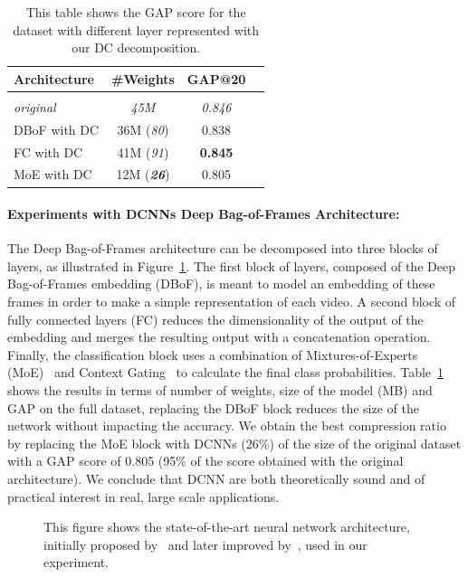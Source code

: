 \begin{table}
  \centering
  \caption{This table shows the GAP score for the \yt dataset with different layer represented with our DC decomposition.}
  \begin{tabular}{lccc}
  \toprule
  \textbf{Architecture} & \textbf{\#Weights} & \textbf{GAP@20} \\
  \hline \\
  \textit{original} & \textit{45M} & \textit{0.846} \\
  DBoF with DC   & 36M (\textit{80}) & 0.838 \\
  FC with DC    & 41M (\textit{91}) & \textbf{0.845} \\
  MoE with DC   & 12M (\textit{\textbf{26}}) & 0.805 \\
  \hline
  \end{tabular}
  \label{table:youtube_full_xp}
\end{table}

\paragraph{Experiments with DCNNs Deep Bag-of-Frames Architecture:}
The Deep Bag-of-Frames architecture can be decomposed into three blocks of layers, as illustrated in Figure~\ref{figure:archi_youtube}.
The first block of layers, composed of the Deep Bag-of-Frames embedding (DBoF), is meant to model an embedding of these frames in order to make a simple representation of each video.
A second block of fully connected layers (FC) reduces the dimensionality of the output of the embedding and merges the resulting output with a concatenation operation.
Finally, the classification block uses a combination of Mixtures-of-Experts (MoE)~\cite{716791,45619} and Context Gating~\cite{miech2017learnable} to calculate the final class probabilities.
Table~\ref{table:youtube_full_xp} shows the results in terms of number of weights, size of the model (MB) and GAP on the full dataset, replacing the DBoF block reduces the size of the network without impacting the accuracy.
We obtain the best compression ratio by replacing the MoE block with DCNNs (26\%) of the size of the original dataset with a GAP score of 0.805 (95\% of the score obtained with the original architecture).
We conclude that DCNN are both theoretically sound and of practical interest in real, large scale applications.

\begin{figure}[htb]
  \centering
  
  \caption{This figure shows the state-of-the-art neural network architecture, initially proposed by~\citet{abu2016youtube} and later improved by~\citet{miech2017learnable}, used in our experiment.}
  \label{figure:archi_youtube}
\end{figure}

